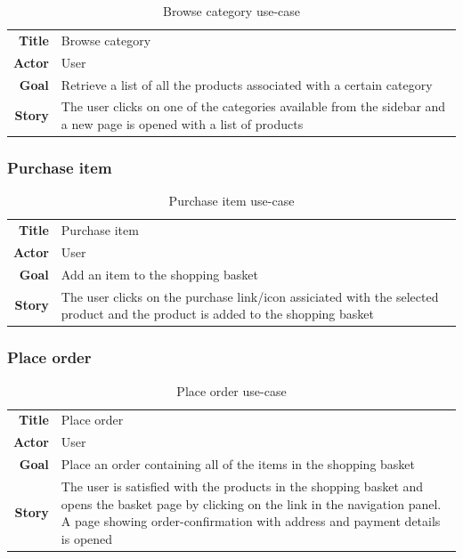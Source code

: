 \documentclass[12pt, a4paper,titlepage]{article}
\begin{document}
\begin{table}[H]
\centering
\begin{tabular}{r | p{12cm}}
\textbf{Title} & Browse category \\
\textbf{Actor} & User \\
\textbf{Goal} & Retrieve a list of all the products associated with a certain category \\
\textbf{Story} & The user clicks on one of the categories available from the sidebar and a new page is opened with a list of products \\
\end{tabular}
\caption{Browse category use-case}
\end{table}

\subsubsection{Purchase item}
\begin{table}[H]
\centering
\begin{tabular}{r | p{12cm}}
\textbf{Title} & Purchase item \\
\textbf{Actor} & User \\
\textbf{Goal} & Add an item to the shopping basket \\
\textbf{Story} & The user clicks on the purchase link/icon assiciated with the selected product and the product is added to the shopping basket\\
\end{tabular}
\caption{Purchase item use-case}
\end{table}

\subsubsection{Place order}
\begin{table}[H]
\centering
\begin{tabular}{r | p{12cm}}
\textbf{Title} & Place order \\
\textbf{Actor} & User \\
\textbf{Goal} & Place an order containing all of the items in the shopping basket \\
\textbf{Story} & The user is satisfied with the products in the shopping basket and opens the basket page by clicking on the link in the navigation panel.
A page showing order-confirmation with address and payment details is opened \\
\end{tabular}
\caption{Place order use-case}
\end{table}
\end{document}

